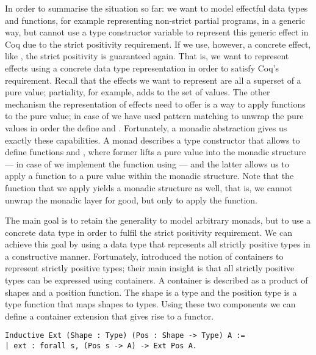 In order to summarise the situation so far: we want to model effectful data types and functions, for example representing non-strict partial programs, in a generic way, but cannot use a type constructor variable to represent this generic effect in Coq due to the strict positivity requirement.
If we use, however, a concrete effect, like , the strict positivity is guaranteed again.
That is, we want to represent effects using a concrete data type representation in order to satisfy Coq's requirement.
Recall that the effects we want to represent are all a superset of a pure value; partiality, for example, adds  to the set of  values.
The other mechanism the representation of effects need to offer is a way to apply functions to the pure value; in case of  we have used pattern matching to unwrap the pure values in order the define  and .
Fortunately, a monadic abstraction gives us exactly these capabilities.
A monad describes a type constructor  that allows to define functions  and , where former lifts a pure value into the monadic structure --- in case of  we implement the function using  --- and the latter allows us to apply a function to a pure value within the monadic structure.
Note that the function that we apply yields a monadic structure as well, that is, we cannot unwrap the monadic layer for good, but only to apply the function.

The main goal is to retain the generality to model arbitrary monads, but to use a concrete data type in order to fulfil the strict positivity requirement.
We can achieve this goal by using a data type that represents all strictly positive types in a constructive manner.
Fortunately, \citet{abbott2003categories} introduced the notion of containers to represent strictly positive types; their main insight is that all strictly positive types can be expressed using containers.
A container is described as a product of shapes and a position function.
The shape is a type  and the position type  is a type function that maps shapes to types.
Using these two components we can define a container extension that gives rise to a functor.

\begin{verbatim}
Inductive Ext (Shape : Type) (Pos : Shape -> Type) A :=
| ext : forall s, (Pos s -> A) -> Ext Pos A.
\end{verbatim}

